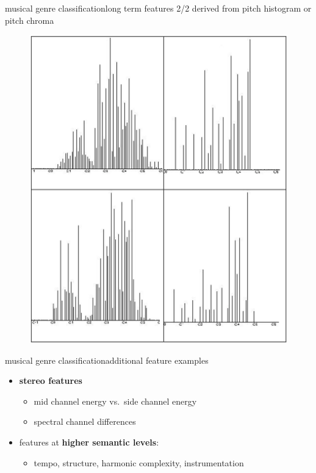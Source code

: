         \begin{frame}{musical genre classification}{long term features 2/2}
            derived from pitch histogram or pitch chroma
            \begin{figure}
                \centering
                \includegraphics[scale=.12]{graph/genre_pitchhisto}
            \end{figure}
        \end{frame}
        \begin{frame}{musical genre classification}{additional feature examples}
            \begin{itemize}
                \item	\textbf{stereo features}
                    \begin{itemize}
                        \item	mid channel energy vs.\ side channel energy
                        \item	spectral channel differences
                    \end{itemize}
                \bigskip
                \item<2->	features at \textbf{higher semantic levels}:
                    \begin{itemize}
                        \item   tempo, structure, harmonic complexity, instrumentation
                    \end{itemize}
            \end{itemize}
        \end{frame}

